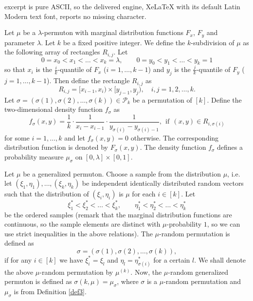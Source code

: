 \documentclass[10pt,a4paper]{amsart}
\def\PD{{\mathcal P}}                     \def\PDW{{\tilde{\cal P}}}
\begin{document}
excerpt is pure ASCII, so the delivered engine, XeLaTeX with its default Latin Modern text font, reports no missing character.
\begin{definition}  \label{def3}
Let $\mu$ be a $\lambda$-permuton with marginal distribution functions 
$F_x$, $F_y$ and parameter $\lambda$.
Let $k$ be a fixed positive integer.
We define the $k$-subdivision of $\mu$ as the following array of rectangles $R_{i,j}$.
Let
$$
0=x_0 < x_1 < \dots < x_k=\lambda, \qquad
0=y_0 < y_1 < \dots < y_k=1
$$
so that $x_i$ is the $\frac{i}{k}$-quantile of $F_x$ ($i=1,\dots ,k-1$)
and
$y_j$ is the $\frac{j}{k}$-quantile of $F_y$ ($j=1,\dots ,k-1$).
Then define the rectangle $R_{i,j}$ as
$$
R_{i,j} = [x_{i-1}, x_i ) \times [y_{j-1}, y_j ), \quad i,j= 1, 2, \dots , k.
$$
Let $\sigma=(\sigma(1), \sigma(2), \dots , \sigma(k))\in \PD_k$ be a permutation of $[k]$.
Define the two-dimensional density function $f_\sigma$ as
\begin{equation}
f_\sigma (x,y)= \frac{1}{k} \cdot \frac{1}{x_i- x_{i-1}} \cdot \frac{1}{y_{\sigma(i)}- y_{\sigma(i)-1}},
\ \ \text{if} \ \ (x,y) \in R_{i,\sigma(i)}
\end{equation}
for some $i= 1, \dots , k$
and let $f_\sigma (x,y)=0$ otherwise.
The corresponding distribution function is denoted by $ F_\sigma (x,y)$.
%
The density function $f_\sigma$ defines a probability measure $\mu_\sigma$ on  
$[0, \lambda] \times [0,1]$.
\end{definition}

\begin{definition}  \label{def4}
Let $\mu$ be a generalized permuton.
Choose a sample from the distribution $\mu$, i.e.
let $(\xi_1, \eta_1), \dots , (\xi_k, \eta_k)$
be independent identically distributed random vectors such that the distribution
of $(\xi_i, \eta_i)$ is $\mu$ for each $i\in [k]$.
Let
$$
\xi_1^\ast< \xi_2^\ast < \dots < \xi_k^\ast , \qquad
\eta_1^\ast< \eta_2^\ast < \dots < \eta_k^\ast
$$
be the ordered samples
(remark that the marginal distribution functions are continuous, so the sample elements are
distinct with $\mu$-probability $1$, so we can use strict inequalities in the above relations).
%
The  $\mu$-random permutation is defined as
$$
\sigma=(\sigma(1), \sigma(2), \dots , \sigma(k)),
$$
if for any $i\in[k]$ we have $\xi_i^\ast =\xi_l$ and $\eta_l = \eta_{\sigma(i)}^\ast$ for 
a certain $l$.
%
We shall denote the above $\mu$-random permutation by $\mu^{(k)}$.
%
Now, the $\mu$-random generalized permuton is defined as
$\sigma(k,\mu) =\mu_\sigma$, where $\sigma$ is a $\mu$-random permutation 
and $\mu_\sigma$ is from Definition \ref{def3}.
\end{definition} 
\end{document}
